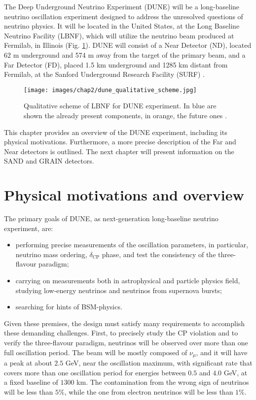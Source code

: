 \label{DUNE-design}
The Deep Underground Neutrino Experiment (DUNE) will be a long-baseline neutrino oscillation experiment designed to address the unresolved questions of neutrino physics. It will be located in the United States, at the Long Baseline Neutrino Facility (LBNF), which will utilize the neutrino beam produced at Fermilab, in Illinois (Fig. \ref{fig:DUNE_scheme}). DUNE will consist of a Near Detector (ND), located 62 m underground and 574 m away from the target of the primary beam, and a Far Detector (FD), placed 1.5 km underground and 1285 km distant from Fermilab, at the Sanford Underground Research Facility (SURF) \cite{dunecollaboration2022snowmass}.

\begin{figure}
    \centering
    \texttt{[image: images/chap2/dune\_qualitative\_scheme.jpg]}
    \caption{Qualitative scheme of LBNF for DUNE experiment. In blue are shown the already present components, in orange, the future ones \cite{fd_tdr_vol1}.}
    \label{fig:DUNE_scheme}
\end{figure}

This chapter provides an overview of the DUNE experiment, including its physical motivations. Furthermore, a more precise description of the Far and Near detectors is outlined. The next chapter will present information on the SAND and GRAIN detectors.

\section{Physical motivations and overview}
The primary goals of DUNE, as next-generation long-baseline neutrino experiment, are: 
\begin{itemize}
    \item performing precise measurements of the oscillation parameters, in particular, neutrino mass ordering, $\delta_{\text{CP}}$ phase, and test the consistency of the three-flavour paradigm;
    \item carrying on measurements both in astrophysical and particle physics field, studying low-energy neutrinos and neutrinos from supernova bursts;
    \item searching for hints of BSM-physics.
\end{itemize}

Given these premises, the design must satisfy many requirements to accomplish these demanding challenges. %
First, to precisely study the CP violation and to verify the three-flavour paradigm, neutrinos will be observed over more than one full oscillation period. The beam will be mostly composed of $\nu_{\mu}$, and it will have a peak at about $2.5$ GeV, near the oscillation maximum, with significant rate that covers more than one oscillation period for energies between $0.5$ and $4.0$ GeV, at a fixed baseline of $1300$ km. The contamination from the wrong sign of neutrinos will be less than $5\%$, while the one from electron neutrinos will be less than $1\%$.

